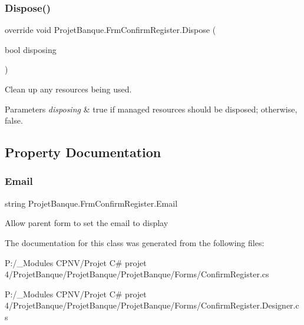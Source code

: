 \subsubsection{\texorpdfstring{Dispose()}{Dispose()}}
{\footnotesize\ttfamily override void Projet\+Banque.\+Frm\+Confirm\+Register.\+Dispose (\begin{DoxyParamCaption}\item[{bool}]{disposing }\end{DoxyParamCaption})\hspace{0.3cm}{\ttfamily [protected]}}



Clean up any resources being used. 


\begin{DoxyParams}{Parameters}
{\em disposing} & true if managed resources should be disposed; otherwise, false.\\
\hline
\end{DoxyParams}


\subsection{Property Documentation}
\mbox{\label{class_projet_banque_1_1_frm_confirm_register_af97db583e5c4a63b7f1c442bd026f5e3}} 
\subsubsection{\texorpdfstring{Email}{Email}}
{\footnotesize\ttfamily string Projet\+Banque.\+Frm\+Confirm\+Register.\+Email\hspace{0.3cm}{\ttfamily [set]}}



Allow parent form to set the email to display 



The documentation for this class was generated from the following files\+:\begin{DoxyCompactItemize}
\item 
P\+:/\+\_\+\+Modules C\+P\+N\+V/\+Projet C\# projet 4/\+Projet\+Banque/\+Projet\+Banque/\+Projet\+Banque/\+Forms/Confirm\+Register.\+cs\item 
P\+:/\+\_\+\+Modules C\+P\+N\+V/\+Projet C\# projet 4/\+Projet\+Banque/\+Projet\+Banque/\+Projet\+Banque/\+Forms/Confirm\+Register.\+Designer.\+cs\end{DoxyCompactItemize}
